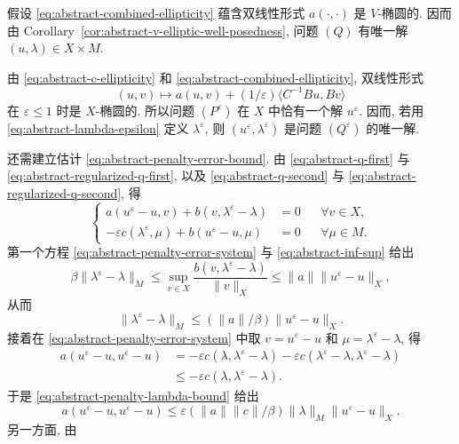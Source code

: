 \begin{Proof}
假设 
\eqref{eq:abstract-combined-ellipticity} 蕴含双线性形式
$a(\cdot,\cdot)$ 是 $V$-椭圆的. 因而由
Corollary~\ref{cor:abstract-v-elliptic-well-posedness},
问题 $(Q)$ 有唯一解 $(u,\lambda)\in X\times M$.

由 
\eqref{eq:abstract-c-ellipticity} 和
\eqref{eq:abstract-combined-ellipticity}, 双线性形式
\[
(u,v)\longmapsto a(u,v)+(1/\varepsilon)
\langle C^{-1}Bu,Bv\rangle
\]
在 $\varepsilon\le1$ 时是 $X$-椭圆的. 所以问题 $(P^\varepsilon)$
在 $X$ 中恰有一个解 $u^\varepsilon$. 因而, 若用
\eqref{eq:abstract-lambda-epsilon} 定义 $\lambda^\varepsilon$,
则 $(u^\varepsilon,\lambda^\varepsilon)$ 是问题 $(Q^\varepsilon)$ 的唯一解.

还需建立估计 
\eqref{eq:abstract-penalty-error-bound}. 由
\eqref{eq:abstract-q-first} 与
\eqref{eq:abstract-regularized-q-first}, 以及
\eqref{eq:abstract-q-second} 与
\eqref{eq:abstract-regularized-q-second}, 得
\begin{equation}\label{eq:abstract-penalty-error-system}
\left\{
\begin{aligned}
a(u^\varepsilon-u,v)+b(v,\lambda^\varepsilon-\lambda)&=0
&&\forall v\in X,\\
-\varepsilon c(\lambda^\varepsilon,\mu)
+b(u^\varepsilon-u,\mu)&=0
&&\forall\mu\in M.
\end{aligned}
\right.
\end{equation}
第一个方程 
\eqref{eq:abstract-penalty-error-system} 与
\eqref{eq:abstract-inf-sup} 给出
\[
\beta\|\lambda^\varepsilon-\lambda\|_M
\le\sup_{v\in X}\frac{b(v,\lambda^\varepsilon-\lambda)}{\|v\|_X}
\le\|a\|\|u^\varepsilon-u\|_X,
\]
从而
\begin{equation}\label{eq:abstract-penalty-lambda-bound}
\|\lambda^\varepsilon-\lambda\|_M
\le(\|a\|/\beta)\|u^\varepsilon-u\|_X.
\end{equation}
接着在 
\eqref{eq:abstract-penalty-error-system} 中取
$v=u^\varepsilon-u$ 和 $\mu=\lambda^\varepsilon-\lambda$, 得
\[
\begin{aligned}
a(u^\varepsilon-u,u^\varepsilon-u)
&=-\varepsilon c(\lambda,\lambda^\varepsilon-\lambda)
-\varepsilon c(\lambda^\varepsilon-\lambda,
\lambda^\varepsilon-\lambda)\\
&\le-\varepsilon c(\lambda,\lambda^\varepsilon-\lambda).
\end{aligned}
\]
于是 
\eqref{eq:abstract-penalty-lambda-bound} 给出
\[
a(u^\varepsilon-u,u^\varepsilon-u)
\le\varepsilon(\|a\|\|c\|/\beta)
\|\lambda\|_M\|u^\varepsilon-u\|_X.
\]
另一方面, 由 

\end{Proof}
